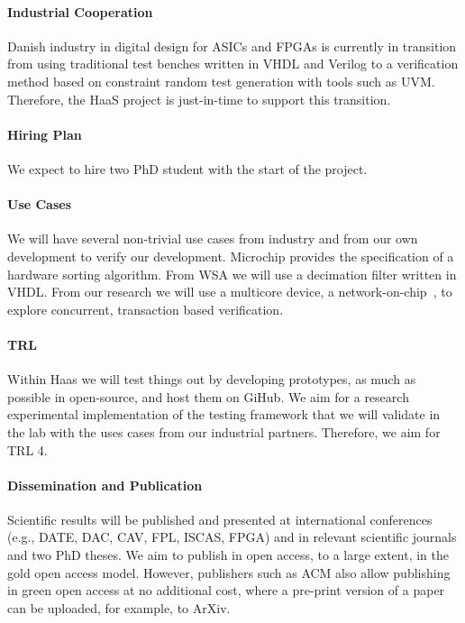 \documentclass[fleqn,12pt]{article}
\begin{document}
\paragraph*{Industrial Cooperation}

Danish industry in digital design for ASICs and FPGAs is currently in transition from using traditional
test benches written in VHDL and Verilog to a verification method based on constraint random
test generation with tools such as UVM. Therefore, the HaaS project is just-in-time to support this
transition.

\paragraph{Hiring Plan} We expect to hire two PhD student with the start of the project.

\paragraph*{Use Cases}

We will have several non-trivial use cases from industry and from our own development to verify
our development.
Microchip provides the specification of a hardware sorting algorithm.
From WSA we will use a decimation filter written in VHDL.
From our research we will use a multicore device, a network-on-chip~\cite{s4noc:nocarc2019},
to explore concurrent, transaction based verification.

\paragraph*{TRL} Within Haas we will test things out by developing prototypes, as much as possible
in open-source, and host them on GiHub. We aim for a research experimental  implementation 
of the testing framework that we will validate in the lab with the uses cases from our
industrial partners. Therefore, we aim for TRL 4.


\paragraph*{Dissemination and Publication}

Scientific results will be published and presented at international
conferences (e.g., DATE, DAC, CAV, FPL, ISCAS, FPGA) and in relevant scientific journals
and two PhD theses.
We aim to publish in open access, to a large extent, in the gold open access model.
However, publishers such as ACM also allow publishing in green open access
at no additional cost, where a pre-print version of a paper can be uploaded,
for example, to ArXiv.
\end{document}

